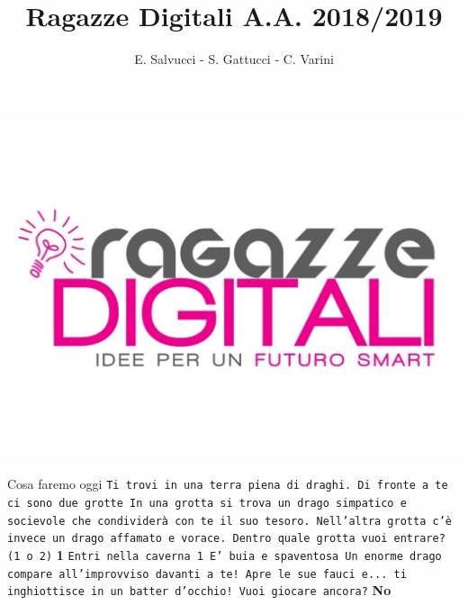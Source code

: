 \documentclass{beamer}
\title[Ragazze Digitali 2019]{Ragazze Digitali A.A. 2018/2019}
\author{E. Salvucci - S. Gattucci - C. Varini}
\date{}
\begin{document}
{\includegraphics[width=\paperwidth,height=\paperheight]{images/ragazze_digitali.jpg}}
\begin{frame}
\end{frame}


\begin{frame}{Cosa faremo oggi}
\texttt{Ti trovi in una terra piena di draghi.\newline
        Di fronte a te ci sono due grotte\newline
        In una grotta si trova un drago simpatico e socievole che condividerà con te il suo tesoro.\newline
        Nell'altra grotta c'è invece un drago affamato e vorace.\newline
        Dentro quale grotta vuoi entrare? (1 o 2)\newline}
\textbf{1\newline}
\texttt{Entri nella caverna 1\newline
        E' buia e spaventosa\newline
        Un enorme drago compare all'improvviso davanti a te! Apre le sue fauci e... ti inghiottisce in un batter d'occhio!\newline
        Vuoi giocare ancora?\newline}
\textbf{No}        
        
\end{frame}














\end{document}

